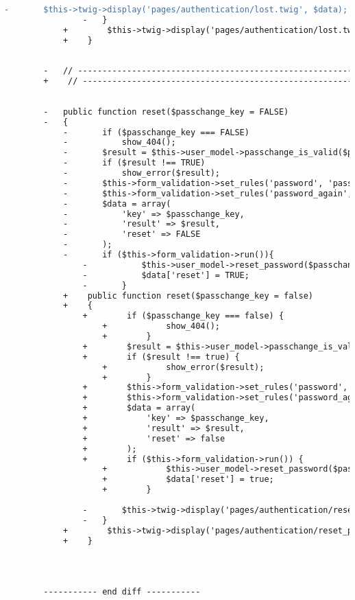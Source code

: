 \begin{lstlisting}[language=diff, caption=Perubahan pada kode Login.php]
				-		$this->twig->display('pages/authentication/lost.twig', $data);
				-	}
			+        $this->twig->display('pages/authentication/lost.twig', $data);
			+    }
		
		
		-	// ------------------------------------------------------------------------
		+    // ------------------------------------------------------------------------
		
		
		-	public function reset($passchange_key = FALSE)
		-	{
			-		if ($passchange_key === FALSE)
			-			show_404();
			-		$result = $this->user_model->passchange_is_valid($passchange_key);
			-		if ($result !== TRUE)
			-			show_error($result);
			-		$this->form_validation->set_rules('password', 'password', 'required|min_length[6]|max_length[200]');
			-		$this->form_validation->set_rules('password_again', 'password confirmation', 'required|matches[password]');
			-		$data = array(
			-			'key' => $passchange_key,
			-			'result' => $result,
			-			'reset' => FALSE
			-		);
			-		if ($this->form_validation->run()){
				-			$this->user_model->reset_password($passchange_key, $this->input->post('password'));
				-			$data['reset'] = TRUE;
				-		}
			+    public function reset($passchange_key = false)
			+    {
				+        if ($passchange_key === false) {
					+            show_404();
					+        }
				+        $result = $this->user_model->passchange_is_valid($passchange_key);
				+        if ($result !== true) {
					+            show_error($result);
					+        }
				+        $this->form_validation->set_rules('password', 'password', 'required|min_length[6]|max_length[200]');
				+        $this->form_validation->set_rules('password_again', 'password confirmation', 'required|matches[password]');
				+        $data = array(
				+            'key' => $passchange_key,
				+            'result' => $result,
				+            'reset' => false
				+        );
				+        if ($this->form_validation->run()) {
					+            $this->user_model->reset_password($passchange_key, $this->input->post('password'));
					+            $data['reset'] = true;
					+        }
				
				-		$this->twig->display('pages/authentication/reset_password.twig', $data);
				-	}
			+        $this->twig->display('pages/authentication/reset_password.twig', $data);
			+    }
		
		
		
		
		----------- end diff -----------
\end{lstlisting}

